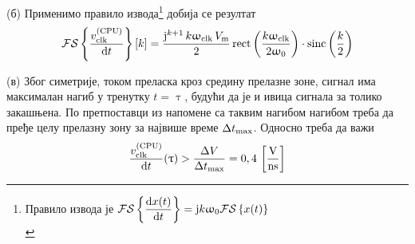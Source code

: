     (б) Применимо правило извода\footnote{Правило извода је 
    $
    \mathcal{FS}\left\{\dfrac{{\rm d} x(t)}{{\rm d} t}\right\} = {\rm j} k \upomega_{\rm 0} 
    \mathcal{FS}\left\{ x(t) \right\} $ \\[1mm]} добија се резултат
    \begin{equation}
        \mathcal{FS}\left\{ \dfrac{v_{\rm clk}^{\rm (CPU)}}{{\rm d} t}\right\} [k]
        = 
        \dfrac{ 
        {\rm j}^{k+1} \,
        k \upomega_{\rm clk} \, 
        V_{\rm m} }{2}
        \operatorname{rect} \left( \dfrac{k{\upomega_{\rm clk}}}{2\upomega_0} \right) 
        \cdot
        \operatorname{sinc} \left(
        \dfrac{k}{2} \right)
    \end{equation}

    (в) 
    Због симетрије, током преласка кроз средину прелазне зоне, сигнал има максималан нагиб у тренутку 
    $t = \uptau$, будући да је и ивица сигнала за толико закашњена. По претпоставци из напомене 
    са таквим нагибом нагибом треба да пређе целу прелазну зону за највише време 
    $\Delta t_{\rm max}$. Односно треба да важи
    \begin{equation}
        \dfrac{ v_{\rm clk}^{\rm (CPU)} }{\de t} (\uptau) > \dfrac{\Delta V}{\Delta t_{\rm max}}
        = 0,4\unit{\dfrac{V}{ns}}  \label{eq:\ID.uslov}
    \end{equation}

